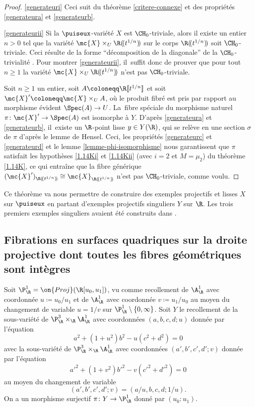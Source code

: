 \skpt
\begin{proof}
\eqref{generateuri}
Ceci suit du théorème \ref{critere-connexe} et des propriétés \eqref{generateura} et \eqref{generateurb}.

\eqref{generateurii}
Si la $\puiseux$-variété $X$ est $\CH_0$-triviale,
alors il existe un entier $n>0$ tel que la variété
$\mc{X}\times_U \R(\!(t^{1/n})\!)$ sur le corps $\R(\!(t^{1/n})\!)$
soit $\CH_0$-triviale. Ceci résulte de la forme ``décomposition de la diagonale''
de la $\CH_0$-trivialité \cite[Prop.\,1.4]{colliot2016hypersurfaces}. Pour montrer \eqref{generateurii}, il~suffit donc de prouver que pour tout $n\geq 1$ la variété
$\mc{X}\times_U \R(\!(t^{1/n})\!)$ n'est pas $\CH_0$-triviale.

Soit $n\geq 1$ un entier, soit $A\coloneqq \R[\![t^{1/n}]\!]$ et soit $\mc{X}'\coloneqq \mc{X}\times_U A$, où le produit fibré est pris par rapport au morphisme évident $\Spec(A)\to U$. La~fibre spéciale du morphisme naturel $\pi\colon \mc{X}'\to \Spec(A)$ est isomorphe à $Y$. D'après \eqref{generateura} et \eqref{generateurb}, il~existe un $\R$-point lisse $y\in Y(\R)$, qui se relève en une section $\sigma$ de $\pi$ d'après le lemme de Hensel. Ceci, les propriétés \eqref{generateurc} et \eqref{generateurd} et le lemme \ref{lemme-phi-isomorphisme} nous garantissent que $\pi$ satisfait les hypothèses \eqref{1.14Ki} et \eqref{1.14Kii} (avec $i=2$ et $M=\mu_2$) du théorème \ref{1.14K}, ce qui entraîne que la fibre générique $(\mc{X}')_{\R(\!(t^{1/n})\!)}\cong\mc{X}_{\R(\!(t^{1/n})\!)}$ n'est pas $\CH_0$-triviale, comme voulu.
\end{proof}

Ce théorème va nous permettre de construire des exemples projectifs et lisses $X$ sur $\puiseux$ en partant d'exemples projectifs singuliers $Y$ sur $\R$. Les trois premiers exemples singuliers avaient été construits dans \cite{colliot2024certaines}.

\subsection{Fibrations en surfaces quadriques sur la droite projective dont toutes les fibres géométriques sont intègres}\label{contreexemple}

Soit $\P^1_\R=\on{Proj}(\R[u_0,u_1])$, vu comme recollement de $\A^1_\R$ avec coordonnée $u\coloneqq u_0/u_1$ et de $\A^1_\R$ avec coordonnée $v\coloneqq u_1/u_0$ au moyen du changement de variable $u=1/v$ sur $\P^1_\R\setminus\{0,\infty\}$. Soit $Y$ le recollement de la sous-variété de $\P^3_{\R} \times_{\R} \A^1_{\R}$ avec coordonnées $(a,b,c,d;u)$ donnée par l'équation
\[a^2+(1+u^2) b^2 - u (c^2+d^2)=0\]
avec la sous-variété de $\P^3_{\R} \times_{\R} \A^1_{\R}$ avec coordonnées $(a',b',c',d'; v)$ donnée par l'équation
\[a'^2+(1+v^2)b'^2-v(c'^2+d'^2)=0\]
au moyen du changement de variable
\[(a',b',c',d';v)=(a/u, b, c, d; 1/u).\] On a un morphisme surjectif $\pi\colon Y \to \P^1_\R$ donné par $(u_0:u_1)$.

